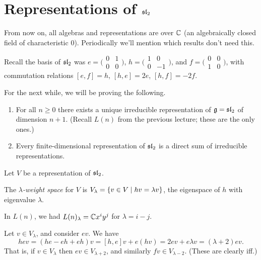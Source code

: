 \section{Representations of \texorpdfstring{$\sl_2$}{sl(2)}}

From now on, all algebras and representations are over $\C$ (an algebraically
closed field of characteristic $0$). Periodically we'll mention which results
don't need this.

Recall the basis of $\sl_2$ was
$e = \bigl(\begin{smallmatrix} 0 & 1 \\ 0 & 0 \end{smallmatrix}\bigr)$,
$h = \bigl(\begin{smallmatrix} 1 & 0 \\ 0 & -1 \end{smallmatrix}\bigr)$, and
$f = \bigl(\begin{smallmatrix} 0 & 0 \\ 1 & 0 \end{smallmatrix}\bigr)$, with
commutation relations $[e, f] = h$, $[h, e] = 2e$, $[h, f] = -2f$.

For the next while, we will be proving the following.

\begin{theorem}\leavevmode
\begin{enumerate}
  \item For all $n \geq 0$ there exists a unique irreducible representation of
    $\g = \sl_2$ of dimension $n + 1$. (Recall $L(n)$ from the previous
    lecture; these are the only ones.)
  \item Every finite-dimensional representation of $\sl_2$ is a direct sum of
    irreducible representations.
\end{enumerate}
\end{theorem}

Let $V$ be a representation of $\sl_2$.

\begin{definition}
The \emph{$\lambda$-weight space} for $V$ is
$V_\lambda = \setc{v \in V}{hv = \lambda v}$, the eigenspace of $h$ with
eigenvalue $\lambda$.
\end{definition}

\begin{example}
In $L(n)$, we had $L(n)_\lambda = \C x^iy^j$ for $\lambda = i - j$.
\end{example}

Let $v \in V_\lambda$, and consider $ev$. We have
\[
  hev = (he - eh + eh)v = [h, e]v + e(hv) = 2ev + e\lambda v = (\lambda + 2)ev.
\]
That is, if $v \in V_\lambda$ then $ev \in V_{\lambda+2}$, and similarly
$fv \in V_{\lambda-2}$. (These are clearly iff.)

